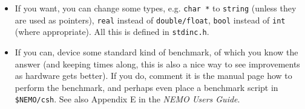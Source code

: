 \begin{itemize}
\item

If you want, you can change some types, e.g. {\tt char *} to
{\tt string} (unless they are used as pointers), {\tt real}
instead of {\tt double/float}, {\tt bool} instead of
{\tt int} (where appropriate). All this is defined in
{\tt stdinc.h}.

\item

If you can, device some standard kind of benchmark, of which
you know the answer (and keeping times along, this is also a
nice way to see improvements as hardware gets better). If you
do, comment it is the manual page how to perform the benchmark,
and perhaps even place a benchmark script in {\tt \$NEMO/csh}.
See also Appendix E in the {\it NEMO Users Guide}.

\end{itemize}

\footnotesize
{}
\normalsize





